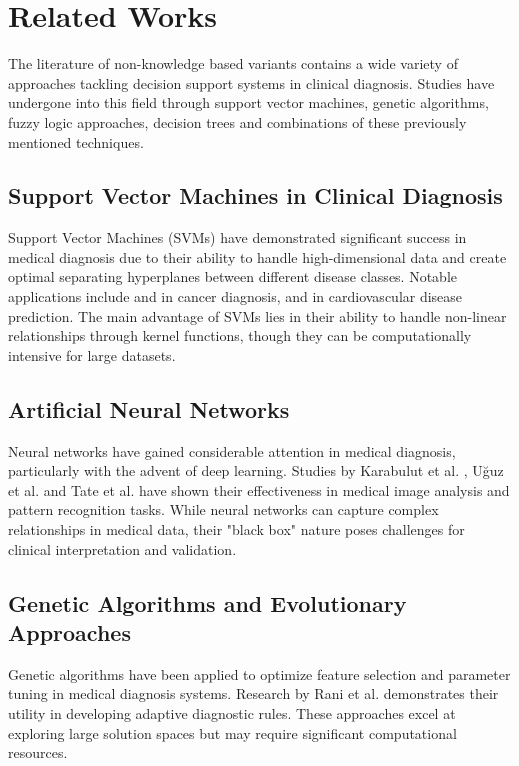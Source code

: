 \documentclass[3p,times,procedia]{elsarticle}
\begin{document}
\section{Related Works}
The literature of non-knowledge based variants contains a wide
variety of approaches tackling decision support systems in
clinical diagnosis. Studies have undergone into this field 
through support vector machines, genetic algorithms, 
fuzzy logic approaches, decision trees and combinations 
of these previously mentioned techniques.

\subsection{Support Vector Machines in Clinical Diagnosis}
Support Vector Machines (SVMs) have demonstrated significant
success in medical diagnosis due to their ability to handle
high-dimensional data and create optimal separating 
hyperplanes between different disease classes. Notable
applications include \cite{CHEN20119014} and \cite{ALAM2018} in 
cancer diagnosis, \cite{Sali2016Clinical} and \cite{COMAK200721}
in cardiovascular disease prediction. The main advantage
of SVMs lies in their
ability to handle non-linear relationships through kernel
functions, though they can be computationally intensive
for large datasets.

\subsection{Artificial Neural Networks}
Neural networks have gained considerable attention in medical
diagnosis, particularly with the advent of deep learning.
Studies by Karabulut et al. \cite{Karabulut2012Effective},
U{\u{g}}uz et al.\cite{Uguz2012Biomedical} and Tate et al.\cite{Tate2006Development} 
have shown their effectiveness in
medical image analysis and pattern recognition tasks. 
While neural networks can capture complex relationships 
in medical data, their "black box" nature poses challenges
for clinical interpretation and validation.

\subsection{Genetic Algorithms and Evolutionary Approaches}
Genetic algorithms have been applied to optimize feature
selection and parameter tuning in medical diagnosis systems.
Research by Rani et al.\cite{Rani2021Decision} demonstrates their utility in
developing adaptive diagnostic rules. These approaches excel
at exploring large solution spaces but may require significant
computational resources.
\end{document}
